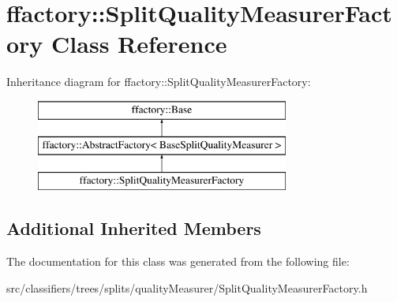 \hypertarget{classffactory_1_1_split_quality_measurer_factory}{\section{ffactory\-:\-:Split\-Quality\-Measurer\-Factory Class Reference}
\label{classffactory_1_1_split_quality_measurer_factory}
}
Inheritance diagram for ffactory\-:\-:Split\-Quality\-Measurer\-Factory\-:\begin{figure}[H]
\begin{center}
\leavevmode
\includegraphics[height=3.000000cm]{classffactory_1_1_split_quality_measurer_factory}
\end{center}
\end{figure}
\subsection*{Additional Inherited Members}


The documentation for this class was generated from the following file\-:\begin{DoxyCompactItemize}
\item 
src/classifiers/trees/splits/quality\-Measurer/Split\-Quality\-Measurer\-Factory.\-h\end{DoxyCompactItemize}
